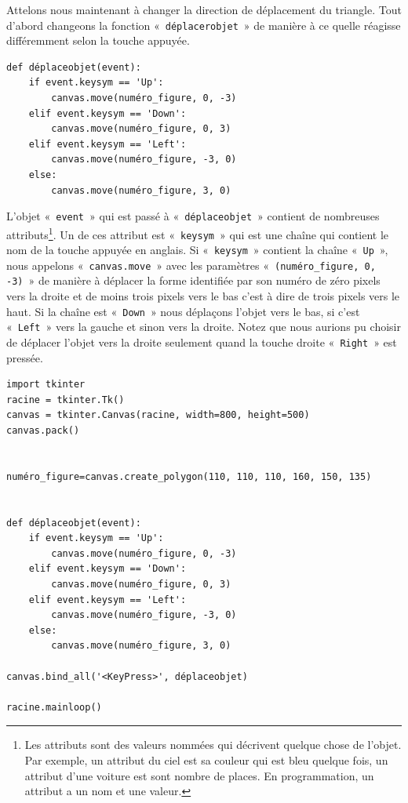 Attelons nous maintenant à changer la direction de déplacement du triangle. Tout d'abord changeons la fonction « \texttt{déplacerobjet} » de manière à ce quelle réagisse différemment selon la touche appuyée.
\begin{Verbatim}[frame=single,rulecolor=\color{mbleu}, label=à taper]
def déplaceobjet(event):
    if event.keysym == 'Up':
        canvas.move(numéro_figure, 0, -3)
    elif event.keysym == 'Down':
        canvas.move(numéro_figure, 0, 3)
    elif event.keysym == 'Left':
        canvas.move(numéro_figure, -3, 0)
    else:
        canvas.move(numéro_figure, 3, 0)
\end{Verbatim}

L'objet « \texttt{event} » qui est passé à « \texttt{déplaceobjet} » contient de nombreuses attributs\footnote{Les attributs sont des valeurs nommées qui décrivent quelque chose de l'objet. Par exemple, un attribut du ciel est sa couleur qui est bleu quelque fois, un attribut d'une voiture est sont nombre de places. En programmation, un attribut a un nom et une valeur.}. Un de ces attribut est « \texttt{keysym} » qui est une chaîne qui contient le nom de la touche appuyée en anglais. Si « \texttt{keysym} » contient la chaîne « \texttt{Up} », nous appelons « \texttt{canvas.move} »  avec les paramètres « \texttt{(numéro\_figure, 0, -3)} » de manière à déplacer la forme identifiée par son numéro de zéro pixels vers la droite et de moins trois pixels vers le bas c'est à dire de trois pixels vers le haut. Si la chaîne est « \texttt{Down} » nous déplaçons l'objet vers le bas, si c'est « \texttt{Left} » vers la gauche et sinon vers la droite. Notez que nous aurions pu choisir de déplacer l'objet vers la droite seulement quand la touche droite « \texttt{Right} » est pressée.

\begin{Verbatim}[frame=single,rulecolor=\color{mbleu}, label=à taper]
import tkinter
racine = tkinter.Tk()
canvas = tkinter.Canvas(racine, width=800, height=500)
canvas.pack()


numéro_figure=canvas.create_polygon(110, 110, 110, 160, 150, 135)


def déplaceobjet(event):
    if event.keysym == 'Up':
        canvas.move(numéro_figure, 0, -3)
    elif event.keysym == 'Down':
        canvas.move(numéro_figure, 0, 3)
    elif event.keysym == 'Left':
        canvas.move(numéro_figure, -3, 0)
    else:
        canvas.move(numéro_figure, 3, 0)

canvas.bind_all('<KeyPress>', déplaceobjet)

racine.mainloop()
\end{Verbatim}

